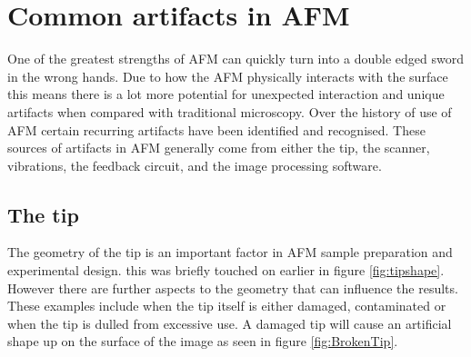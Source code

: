 




\section{Common artifacts in AFM}
\label{chap:commonArtifacts}

One of the greatest strengths of AFM can quickly turn into a double edged sword in the wrong hands. Due to how the AFM physically interacts with the surface this means there is a lot more potential for unexpected interaction and unique artifacts when compared with traditional microscopy. Over the history of use of AFM certain recurring artifacts have been identified and recognised. These sources of artifacts in AFM generally come from either the tip, the scanner, vibrations, the feedback circuit, and the image processing software. 

\subsection{The tip}

The geometry of the tip is an important factor in AFM sample preparation and experimental design. this was briefly touched on earlier in figure \ref{fig:tipshape}. However there are further aspects to the geometry that can influence the results. These examples include when the tip itself is either damaged, contaminated or when the tip is dulled from excessive use. A damaged tip will cause an artificial shape up on the surface of the image as seen in figure \ref{fig:BrokenTip}. 

